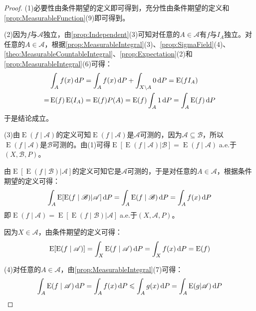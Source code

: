 \begin{proof}
	(1)必要性由条件期望的定义即可得到，充分性由条件期望的定义和\cref{prop:MeasurableFunction}(9)即可得到。\par
	(2)因为$f$与$\mathscr{A}$独立，由\cref{prop:Independent}(3)可知对任意的$A\in\mathscr{A}$有$f$与$I_A$独立。对任意的$A\in\mathscr{A}$，根据\cref{prop:MeasurableIntegral}(3)、\cref{prop:SigmaField}(4)、\cref{theo:MeasurableCountableIntegral}、\cref{prop:Expectation}(2)和\cref{prop:MeasurableIntegral}(6)可得：
	\begin{align*}
		&\int_{A}f(x)\mathop{}\!\mathrm{d} P=\int_{A}f(x)\mathop{}\!\mathrm{d} P+\int_{X\setminus A}0\mathop{}\!\mathrm{d} P=\operatorname{E}(fI_A) \\
		=&\operatorname{E}(f)\operatorname{E}(I_A)=\operatorname{E}(f)P(A)=\operatorname{E}(f)\int_{A}1\mathop{}\!\mathrm{d} P=\int_{A}\operatorname{E}(f)\mathop{}\!\mathrm{d} P
	\end{align*}
	于是结论成立。\par
	(3)由$\operatorname{E}(f\mid\mathscr{A})$的定义可知$\operatorname{E}(f\mid\mathscr{A})$是$\mathscr{A}$可测的，因为$\mathscr{A}\subseteq\mathscr{B}$，所以$\operatorname{E}(f\mid\mathscr{A})$是$\mathscr{B}$可测的。由(1)可得$\operatorname{E}[\operatorname{E}(f\mid\mathscr{A})|\mathscr{B}]=\operatorname{E}(f\mid\mathscr{A})\;$a.e.于$(X,\mathscr{B},P)$。\par
	由$\operatorname{E}[\operatorname{E}(f\mid\mathscr{B})|\mathscr{A}]$的定义可知它是$\mathscr{A}$可测的，于是对任意的$A\in\mathscr{A}$，根据条件期望的定义可得：
	\begin{equation*}
		\int_{A}\operatorname{E}[\operatorname{E}(f\mid\mathscr{B})|\mathscr{A}]\mathop{}\!\mathrm{d} P=\int_{A}\operatorname{E}(f\mid\mathscr{B})\mathop{}\!\mathrm{d} P=\int_{A}f(x)\mathop{}\!\mathrm{d} P
	\end{equation*}
	即$\operatorname{E}(f\mid\mathscr{A})=\operatorname{E}[\operatorname{E}(f\mid\mathscr{B})|\mathscr{A}]\;$a.e.于$(X,\mathscr{A},P)$。\par
	因为$X\in\mathscr{A}$，由条件期望的定义可得：
	\begin{equation*}
		\operatorname{E}[\operatorname{E}(f\mid\mathscr{A})]=\int_{X}\operatorname{E}(f\mid\mathscr{A})\mathop{}\!\mathrm{d} P=\int_{X}f(x)\mathop{}\!\mathrm{d} P=\operatorname{E}(f)
	\end{equation*}\par
	(4)对任意的$A\in\mathscr{A}$，由\cref{prop:MeasurableIntegral}(7)可得：
	\begin{equation*}
		\int_{A}\operatorname{E}(f\mid\mathscr{A})\mathop{}\!\mathrm{d} P=\int_{A}f(x)\mathop{}\!\mathrm{d} P\leqslant\int_{A}g(x)\mathop{}\!\mathrm{d} P=\int_{A}\operatorname{E}(g|\mathscr{A})\mathop{}\!\mathrm{d} P
	\end{equation*}

\end{proof}
